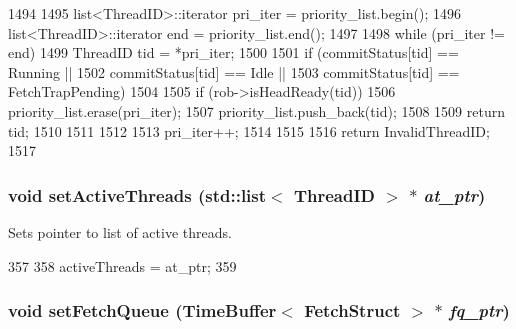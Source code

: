 \begin{DoxyCode}
1494 {
1495     list<ThreadID>::iterator pri_iter = priority_list.begin();
1496     list<ThreadID>::iterator end      = priority_list.end();
1497 
1498     while (pri_iter != end) {
1499         ThreadID tid = *pri_iter;
1500 
1501         if (commitStatus[tid] == Running ||
1502             commitStatus[tid] == Idle ||
1503             commitStatus[tid] == FetchTrapPending) {
1504 
1505             if (rob->isHeadReady(tid)) {
1506                 priority_list.erase(pri_iter);
1507                 priority_list.push_back(tid);
1508 
1509                 return tid;
1510             }
1511         }
1512 
1513         pri_iter++;
1514     }
1515 
1516     return InvalidThreadID;
1517 }
\end{DoxyCode}
\hypertarget{classDefaultCommit_aab96bdacf8bd420402cbb543f994e054}{
\subsubsection[{setActiveThreads}]{\setlength{\rightskip}{0pt plus 5cm}void setActiveThreads ({\bf std::list}$<$ {\bf ThreadID} $>$ $\ast$ {\em at\_\-ptr})}}
\label{classDefaultCommit_aab96bdacf8bd420402cbb543f994e054}
Sets pointer to list of active threads. 


\begin{DoxyCode}
357 {
358     activeThreads = at_ptr;
359 }
\end{DoxyCode}
\hypertarget{classDefaultCommit_ad1be90519aa7737ddf8e41de079a5ea9}{
\subsubsection[{setFetchQueue}]{\setlength{\rightskip}{0pt plus 5cm}void setFetchQueue ({\bf TimeBuffer}$<$ {\bf FetchStruct} $>$ $\ast$ {\em fq\_\-ptr})}}
\label{classDefaultCommit_ad1be90519aa7737ddf8e41de079a5ea9}




